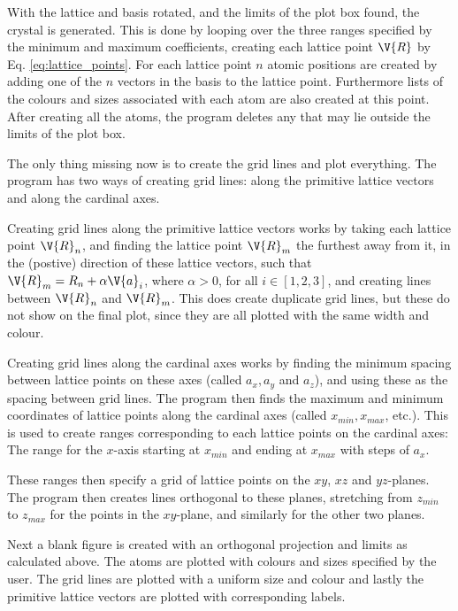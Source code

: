 \documentclass[main.tex]{subfiles}
\begin{document}
	With the lattice and basis rotated, and the limits of the plot box found, the crystal is generated. This is done by looping over the three ranges specified by the minimum and maximum coefficients, creating each lattice point $ \V{R} $ by Eq. \eqref{eq:lattice_points}. For each lattice point $ n $ atomic positions are created by adding one of the $ n $ vectors in the basis to the lattice point. Furthermore lists of the colours and sizes associated with each atom are also created at this point. After creating all the atoms, the program deletes any that may lie outside the limits of the plot box.
	
	The only thing missing now is to create the grid lines and plot everything. The program has two ways of creating grid lines: along the primitive lattice vectors and along the cardinal axes.
	
	Creating grid lines along the primitive lattice vectors works by taking each lattice point $ \V{R}_n $, and finding the lattice point $ \V{R}_m $ the furthest away from it, in the (postive) direction of these lattice vectors, such that $ \V{R}_m = R_n + \alpha \V{a}_i $, where $ \alpha > 0 $, for all $ i \in [1,2,3] $, and creating lines between $ \V{R}_n $ and $ \V{R}_m $. This does create duplicate grid lines, but these do not show on the final plot, since they are all plotted with the same width and colour.
	
	Creating grid lines along the cardinal axes works by finding the minimum spacing between lattice points on these axes (called $ a_x, a_y$ and $ a_z $), and using these as the spacing between grid lines. The program then finds the maximum and minimum coordinates of lattice points along the cardinal axes (called $x_{min}, x_{max}$, etc.). This is used to create ranges corresponding to each lattice points on the cardinal axes: The range for the $ x $-axis starting at $ x_{min} $  and ending at $ x_{max} $ with steps of $ a_x $.
	
	These ranges then specify a grid of lattice points on the $ xy$, $ xz $ and $ yz $-planes. The program then creates lines orthogonal to these planes, stretching from $ z_{min} $ to $ z_{max} $ for the points in the $ xy $-plane, and similarly for the other two planes.
	
	Next a blank figure is created with an orthogonal projection and limits as calculated above. The atoms are plotted with colours and sizes specified by the user. The grid lines are plotted with a uniform size and colour and lastly the primitive lattice vectors are plotted with corresponding labels.
\end{document}
